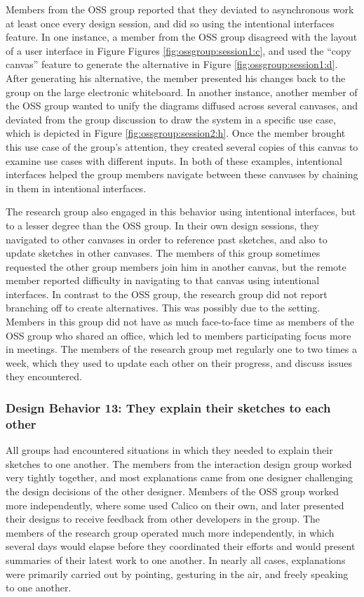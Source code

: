 Members from the OSS group reported that they deviated to asynchronous work at least once every design session, and did so using the intentional interfaces feature. 
In one instance, a member from the OSS group disagreed with the layout of a user interface in Figure Figures \ref{fig:ossgroup:session1:c}, and used the ``copy canvas'' feature to generate the alternative in Figure \ref{fig:ossgroup:session1:d}. After generating his alternative, the member presented his changes back to the group on the large electronic whiteboard. In another instance, another member of the OSS group wanted to unify the diagrams diffused across several canvases, and deviated from the group discussion to draw the system in a specific use case, which is depicted in Figure \ref{fig:ossgroup:session2:h}. Once the member brought this use case of the group's attention, they created several copies of this canvas to examine use cases with different inputs. In both of these examples, intentional interfaces helped the group members navigate between these canvases by chaining in them in intentional interfaces.

The research group also engaged in this behavior using intentional interfaces, but to a lesser degree than the OSS group. In their own design sessions, they navigated to other canvases in order to reference past sketches, and also to update sketches in other canvases. The members of this group sometimes requested the other group members join him in another canvas, but the remote member reported difficulty in navigating to that canvas using intentional interfaces. In contrast to the OSS group, the research group did not report branching off to create alternatives. This was possibly due to the setting. Members in this group did not have as much face-to-face time as members of the OSS group who shared an office, which led to members participating focus more in meetings. The members of the research group met regularly one to two times a week, which they used to update each other on their progress, and discuss issues they encountered. 

%

\subsubsection{Design Behavior 13: They explain their sketches to each other}

All groups had encountered situations in which they needed to explain their sketches to one another. The members from the interaction design group worked very tightly together, and most explanations came from one designer challenging the design decisions of the other designer. Members of the OSS group worked more independently, where some used Calico on their own, and later presented their designs to receive feedback from other developers in the group. The members of the research group operated much more independently, in which several days would elapse before they coordinated their efforts and would present summaries of their latest work to one another. In nearly all cases, explanations were primarily carried out by pointing, gesturing in the air, and freely speaking to one another.


